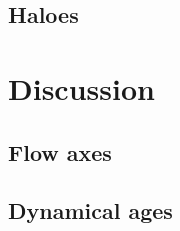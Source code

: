 \documentclass[useAMS, usenatbib, a4paper]{mnras}
\begin{document}
\subsection{Haloes}
\label{sec:haloes}

\section{Discussion}
\label{sec:discussion}

\subsection{Flow axes}
\label{sec:flow-axes}

\subsection{Dynamical ages}
\label{sec:dynamical-ages}



\bsp	%
\label{lastpage}
\end{document}
